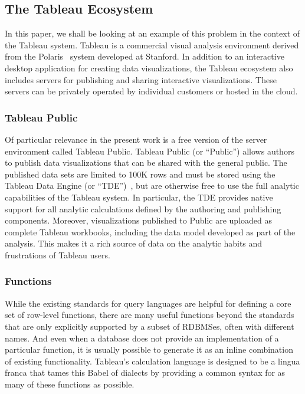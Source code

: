 \subsection{The Tableau Ecosystem}
In this paper, we shall be looking at an example of this problem in the context of the Tableau system. Tableau is a commercial visual analysis environment derived from the Polaris~\cite{Stolte:2008} system developed at Stanford. In addition to an interactive desktop application for creating data visualizations, the Tableau ecosystem also includes servers for publishing and sharing interactive visualizations. These servers can be privately operated by individual customers or hosted in the cloud. 

\subsubsection{Tableau Public}
Of particular relevance in the present work is a free version of the server environment called Tableau Public. Tableau Public (or ``Public'') allows authors to publish data visualizations that can be shared with the general public. The published data sets are limited to 100K rows and must be stored using the Tableau Data Engine (or ``TDE'')~\cite{Wesley:2011,Wesley:2014}, but are otherwise free to use the full analytic capabilities of the Tableau system. In particular, the TDE provides native support for all analytic calculations defined by the authoring and publishing components. Moreover, visualizations published to Public are uploaded as complete Tableau workbooks, including the data model developed as part of the analysis. This makes it a rich source of data on the analytic habits and frustrations of Tableau users.

\subsubsection{Functions}
While the existing standards for query languages are helpful for defining a core set of row-level functions, there are many useful functions beyond the standards that are only explicitly supported by a subset of RDBMSes, often with different names. And even when a database does not provide an implementation of a particular function, it is usually possible to generate it as an inline combination of existing functionality. Tableau's calculation language is designed to be a lingua franca that tames this Babel of dialects by providing a common syntax for as many of these functions as possible.

